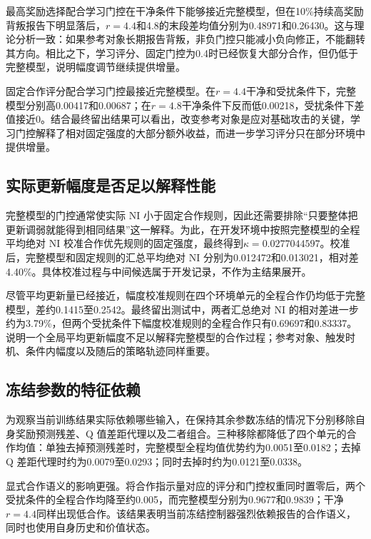 

最高奖励选择配合学习门控在干净条件下能够接近完整模型，但在10\%持续高奖励背叛报告下明显落后，$r=4.4$和4.8的末段差均值分别为0.48971和0.26430。这与理论分析一致：如果参考对象长期报告背叛，非负门控只能减小负向修正，不能翻转其方向。相比之下，学习评分、固定门控为0.4时已经恢复大部分合作，但仍低于完整模型，说明幅度调节继续提供增量。

固定合作评分配合学习门控最接近完整模型。在$r=4.4$干净和受扰条件下，完整模型分别高0.00417和0.00687；在$r=4.8$干净条件下反而低0.00218，受扰条件下差值接近0。结合最终留出结果可以看出，改变参考对象是应对基础攻击的关键，学习门控解释了相对固定强度的大部分额外收益，而进一步学习评分只在部分环境中提供增量。

\subsection{实际更新幅度是否足以解释性能}

完整模型的门控通常使实际 NI 小于固定合作规则，因此还需要排除“只要整体把更新调弱就能得到相同结果”这一解释。为此，在开发环境中按照完整模型的全程平均绝对 NI 校准合作优先规则的固定强度，最终得到$\kappa=0.0277044597$。校准后，完整模型和固定规则的汇总平均绝对 NI 分别为0.012472和0.013021，相对差4.40\%。具体校准过程与中间候选属于开发记录，不作为主结果展开。



尽管平均更新量已经接近，幅度校准规则在四个环境单元的全程合作仍均低于完整模型，差约0.1415至0.2542。最终留出测试中，两者汇总绝对 NI 的相对差进一步约为3.79\%，但两个受扰条件下幅度校准规则的全程合作只有0.69697和0.83337。说明一个全局平均更新幅度不足以解释完整模型的合作过程；参考对象、触发时机、条件内幅度以及随后的策略轨迹同样重要。

\subsection{冻结参数的特征依赖}

为观察当前训练结果实际依赖哪些输入，在保持其余参数冻结的情况下分别移除自身奖励预测残差、Q 值差距代理以及二者组合。三种移除都降低了四个单元的合作均值：单独去掉预测残差时，完整模型全程均值优势约为0.0051至0.0182；去掉 Q 差距代理时约为0.0079至0.0293；同时去掉时约为0.0121至0.0338。



显式合作语义的影响更强。将合作指示量对应的评分和门控权重同时置零后，两个受扰条件的全程合作均降至约0.005，而完整模型分别为0.9677和0.9839；干净$r=4.4$同样出现低合作。该结果表明当前冻结控制器强烈依赖报告的合作语义，同时也使用自身历史和价值状态。

